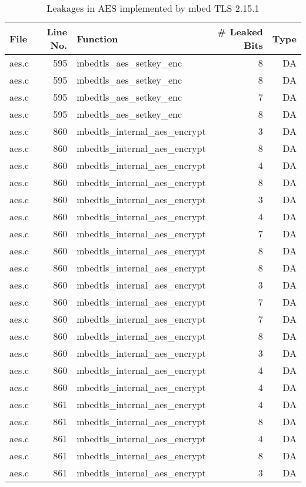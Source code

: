 \begin{table}[h!]
\centering\tiny\scriptsize
\caption{Leakages in AES implemented by mbed TLS 2.15.1}\label{tab:AESmbed TLS2.15.1}
\begin{tabular}{lrlrr}
\hline
\textbf{File} & \textbf{Line No.} & \textbf{Function} & \textbf{\# Leaked Bits} & \textbf{Type} \\\hline
aes.c& 595&mbedtls\_aes\_setkey\_enc&8 &DA\\
aes.c& 595&mbedtls\_aes\_setkey\_enc&8 &DA\\
aes.c& 595&mbedtls\_aes\_setkey\_enc&7 &DA\\
aes.c& 595&mbedtls\_aes\_setkey\_enc&8 &DA\\
aes.c& 860&mbedtls\_internal\_aes\_encrypt&3 &DA\\
aes.c& 860&mbedtls\_internal\_aes\_encrypt&8 &DA\\
aes.c& 860&mbedtls\_internal\_aes\_encrypt&4 &DA\\
aes.c& 860&mbedtls\_internal\_aes\_encrypt&8 &DA\\
aes.c& 860&mbedtls\_internal\_aes\_encrypt&3 &DA\\
aes.c& 860&mbedtls\_internal\_aes\_encrypt&4 &DA\\
aes.c& 860&mbedtls\_internal\_aes\_encrypt&7 &DA\\
aes.c& 860&mbedtls\_internal\_aes\_encrypt&8 &DA\\
aes.c& 860&mbedtls\_internal\_aes\_encrypt&8 &DA\\
aes.c& 860&mbedtls\_internal\_aes\_encrypt&3 &DA\\
aes.c& 860&mbedtls\_internal\_aes\_encrypt&7 &DA\\
aes.c& 860&mbedtls\_internal\_aes\_encrypt&7 &DA\\
aes.c& 860&mbedtls\_internal\_aes\_encrypt&8 &DA\\
aes.c& 860&mbedtls\_internal\_aes\_encrypt&3 &DA\\
aes.c& 860&mbedtls\_internal\_aes\_encrypt&4 &DA\\
aes.c& 860&mbedtls\_internal\_aes\_encrypt&4 &DA\\
aes.c& 861&mbedtls\_internal\_aes\_encrypt&4 &DA\\
aes.c& 861&mbedtls\_internal\_aes\_encrypt&8 &DA\\
aes.c& 861&mbedtls\_internal\_aes\_encrypt&4 &DA\\
aes.c& 861&mbedtls\_internal\_aes\_encrypt&8 &DA\\
aes.c& 861&mbedtls\_internal\_aes\_encrypt&3 &DA\\

\end{tabular}
\end{table}
